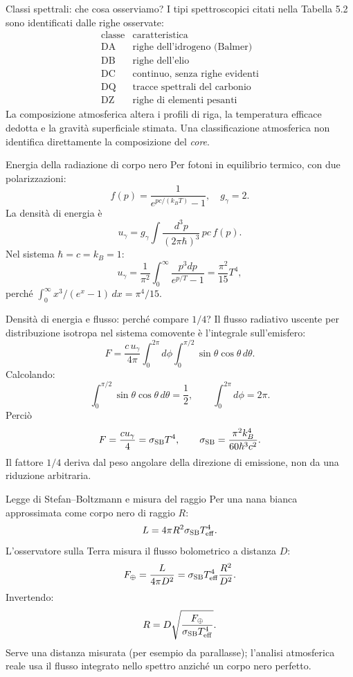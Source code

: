 \begin{frame}[t]{Classi spettrali: che cosa osserviamo?}
\small
I tipi spettroscopici citati nella Tabella 5.2 sono identificati dalle righe osservate:
\[
\begin{array}{c|l}
\text{classe}&\text{caratteristica}\\\hline
\mathrm{DA}&\text{righe dell'idrogeno (Balmer)}\\
\mathrm{DB}&\text{righe dell'elio}\\
\mathrm{DC}&\text{continuo, senza righe evidenti}\\
\mathrm{DQ}&\text{tracce spettrali del carbonio}\\
\mathrm{DZ}&\text{righe di elementi pesanti}
\end{array}
\]
La composizione atmosferica altera i profili di riga, la temperatura efficace dedotta e la gravità superficiale stimata. Una classificazione atmosferica non identifica direttamente la composizione del \emph{core}.
\end{frame}

\begin{frame}[t]{Energia della radiazione di corpo nero}
\small
Per fotoni in equilibrio termico, con due polarizzazioni:
\[
f(p)=\frac1{e^{pc/(k_BT)}-1},\quad g_\gamma=2.
\]
La densità di energia è
\[
u_\gamma=g_\gamma\int\frac{d^3p}{(2\pi\hbar)^3}\,pc\,f(p).
\]
Nel sistema $\hbar=c=k_B=1$:
\[
u_\gamma=\frac1{\pi^2}\int_0^\infty\frac{p^3dp}{e^{p/T}-1}
=\frac{\pi^2}{15}T^4,
\]
perché $\int_0^\infty x^3/(e^x-1)\,dx=\pi^4/15$.
\end{frame}

\begin{frame}[t]{Densità di energia e flusso: perché compare $1/4$?}
\small
Il flusso radiativo uscente per distribuzione isotropa nel sistema comovente è l'integrale sull'emisfero:
\[
F=\frac{c\,u_\gamma}{4\pi}\int_0^{2\pi}d\phi
\int_0^{\pi/2}\sin\theta\cos\theta\,d\theta.
\]
Calcolando:
\[
\int_0^{\pi/2}\sin\theta\cos\theta\,d\theta=\frac12,
\qquad \int_0^{2\pi}d\phi=2\pi.
\]
Perciò
\[
F=\frac{cu_\gamma}{4}=\sigma_{\rm SB}T^4,
\qquad \sigma_{\rm SB}=\frac{\pi^2 k_B^4}{60\hbar^3c^2}.
\]
Il fattore $1/4$ deriva dal peso angolare della direzione di emissione, non da una riduzione arbitraria.
\end{frame}

\begin{frame}[t]{Legge di Stefan--Boltzmann e misura del raggio}
\small
Per una nana bianca approssimata come corpo nero di raggio $R$:
\[
L=4\pi R^2\sigma_{\rm SB}T_{\rm eff}^4.
\]
L'osservatore sulla Terra misura il flusso bolometrico a distanza $D$:
\[
F_\oplus=\frac{L}{4\pi D^2}
=\sigma_{\rm SB}T_{\rm eff}^4\frac{R^2}{D^2}.
\]
Invertendo:
\[
R=D\sqrt{\frac{F_\oplus}{\sigma_{\rm SB}T_{\rm eff}^4}}.
\]
Serve una distanza misurata (per esempio da parallasse); l'analisi atmosferica reale usa il flusso integrato nello spettro anziché un corpo nero perfetto.
\end{frame}

